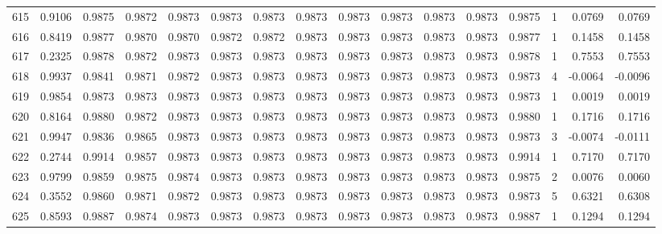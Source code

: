 \begin{tabular}{lrrrrrrrrrrrrrrr}
615 &      0.9106 &  0.9875 &  0.9872 &  0.9873 &  0.9873 &  0.9873 &  0.9873 &  0.9873 &  0.9873 &  0.9873 &   0.9873 &     0.9875 &      1 &                    0.0769 &                     0.0769 \\
616 &      0.8419 &  0.9877 &  0.9870 &  0.9870 &  0.9872 &  0.9872 &  0.9873 &  0.9873 &  0.9873 &  0.9873 &   0.9873 &     0.9877 &      1 &                    0.1458 &                     0.1458 \\
617 &      0.2325 &  0.9878 &  0.9872 &  0.9873 &  0.9873 &  0.9873 &  0.9873 &  0.9873 &  0.9873 &  0.9873 &   0.9873 &     0.9878 &      1 &                    0.7553 &                     0.7553 \\
618 &      0.9937 &  0.9841 &  0.9871 &  0.9872 &  0.9873 &  0.9873 &  0.9873 &  0.9873 &  0.9873 &  0.9873 &   0.9873 &     0.9873 &      4 &                   -0.0064 &                    -0.0096 \\
619 &      0.9854 &  0.9873 &  0.9873 &  0.9873 &  0.9873 &  0.9873 &  0.9873 &  0.9873 &  0.9873 &  0.9873 &   0.9873 &     0.9873 &      1 &                    0.0019 &                     0.0019 \\
620 &      0.8164 &  0.9880 &  0.9872 &  0.9873 &  0.9873 &  0.9873 &  0.9873 &  0.9873 &  0.9873 &  0.9873 &   0.9873 &     0.9880 &      1 &                    0.1716 &                     0.1716 \\
621 &      0.9947 &  0.9836 &  0.9865 &  0.9873 &  0.9873 &  0.9873 &  0.9873 &  0.9873 &  0.9873 &  0.9873 &   0.9873 &     0.9873 &      3 &                   -0.0074 &                    -0.0111 \\
622 &      0.2744 &  0.9914 &  0.9857 &  0.9873 &  0.9873 &  0.9873 &  0.9873 &  0.9873 &  0.9873 &  0.9873 &   0.9873 &     0.9914 &      1 &                    0.7170 &                     0.7170 \\
623 &      0.9799 &  0.9859 &  0.9875 &  0.9874 &  0.9873 &  0.9873 &  0.9873 &  0.9873 &  0.9873 &  0.9873 &   0.9873 &     0.9875 &      2 &                    0.0076 &                     0.0060 \\
624 &      0.3552 &  0.9860 &  0.9871 &  0.9872 &  0.9873 &  0.9873 &  0.9873 &  0.9873 &  0.9873 &  0.9873 &   0.9873 &     0.9873 &      5 &                    0.6321 &                     0.6308 \\
625 &      0.8593 &  0.9887 &  0.9874 &  0.9873 &  0.9873 &  0.9873 &  0.9873 &  0.9873 &  0.9873 &  0.9873 &   0.9873 &     0.9887 &      1 &                    0.1294 &                     0.1294 \\

\end{tabular}
